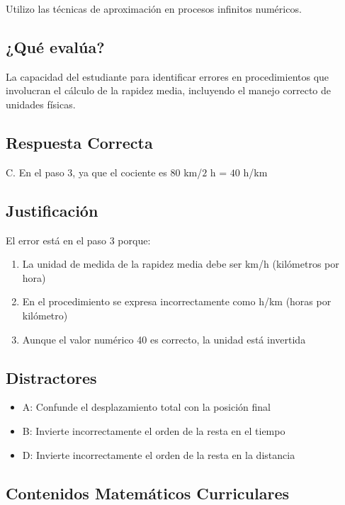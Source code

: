 \documentclass[
]{article}
\providecommand{\tightlist}{%
  \setlength{\itemsep}{0pt}\setlength{\parskip}{0pt}}
\begin{document}
Utilizo las técnicas de aproximación en procesos infinitos numéricos.

\subsection{¿Qué evalúa?}\label{quuxe9-evaluxfaa-2}

La capacidad del estudiante para identificar errores en procedimientos
que involucran el cálculo de la rapidez media, incluyendo el manejo
correcto de unidades físicas.

\subsection{Respuesta Correcta}\label{respuesta-correcta}

C. En el paso 3, ya que el cociente es \(80\) km/\(2\) h = \(40\) h/km

\subsection{Justificación}\label{justificaciuxf3n-4}

El error está en el paso 3 porque:

\begin{enumerate}
\def\labelenumi{\arabic{enumi}.}
\tightlist
\item
  La unidad de medida de la rapidez media debe ser km/h (kilómetros por
  hora)
\item
  En el procedimiento se expresa incorrectamente como h/km (horas por
  kilómetro)
\item
  Aunque el valor numérico 40 es correcto, la unidad está invertida
\end{enumerate}

\subsection{Distractores}\label{distractores-2}

\begin{itemize}
\tightlist
\item
  A: Confunde el desplazamiento total con la posición final
\item
  B: Invierte incorrectamente el orden de la resta en el tiempo
\item
  D: Invierte incorrectamente el orden de la resta en la distancia
\end{itemize}

\subsection{Contenidos Matemáticos
Curriculares}\label{contenidos-matemuxe1ticos-curriculares-3}
\end{document}
